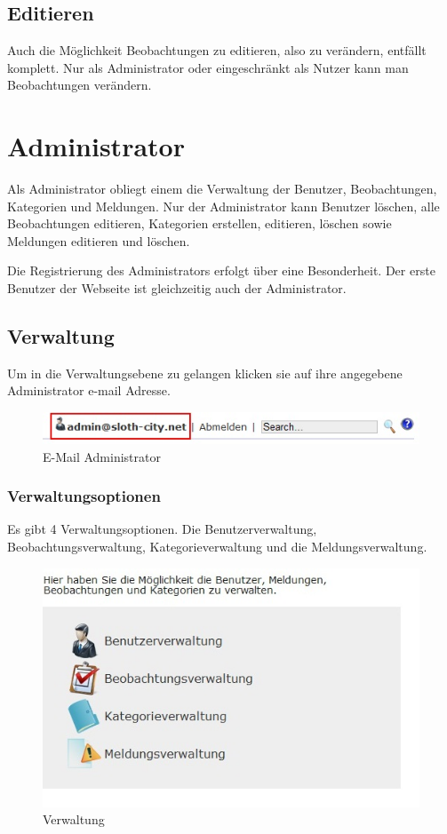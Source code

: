 \documentclass[a4paper,11pt]{scrartcl}
\begin{document}
\subsection{Editieren}
Auch die Möglichkeit Beobachtungen zu editieren, also zu verändern, entfällt komplett. Nur als Administrator oder eingeschränkt als Nutzer kann man Beobachtungen verändern.

\newpage

\section{Administrator}
Als Administrator obliegt einem die Verwaltung der Benutzer, Beobachtungen, Kategorien und Meldungen. Nur der Administrator kann Benutzer löschen, alle Beobachtungen editieren, Kategorien erstellen, editieren, löschen sowie Meldungen editieren und löschen.  

Die Registrierung des Administrators erfolgt über eine Besonderheit. Der erste Benutzer der Webseite ist gleichzeitig auch der Administrator.

\subsection{Verwaltung}
Um in die Verwaltungsebene zu gelangen klicken sie auf ihre angegebene Administrator e-mail Adresse.
\begin{figure}[h]
\centering
\includegraphics[width = 10 cm]{img/adminemail}
\caption{E-Mail Administrator}
\label{E-Mail Administrator}
\end{figure} 

\subsubsection{Verwaltungsoptionen}
Es gibt 4 Verwaltungsoptionen. Die Benutzerverwaltung, Beobachtungsverwaltung, Kategorieverwaltung und die Meldungsverwaltung.
\begin{figure}[h]
\centering
\includegraphics[width = 10 cm]{img/Verwaltung}
\caption{Verwaltung}
\label{Verwaltung}
\end{figure}
\end{document}
